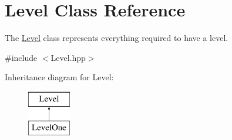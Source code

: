 \hypertarget{class_level}{\section{Level Class Reference}
\label{class_level}
}


The \hyperlink{class_level}{Level} class represents everything required to have a level.  




{\ttfamily \#include $<$Level.\-hpp$>$}

Inheritance diagram for Level\-:\begin{figure}[H]
\begin{center}
\leavevmode
\includegraphics[height=2.000000cm]{class_level}
\end{center}
\end{figure}

